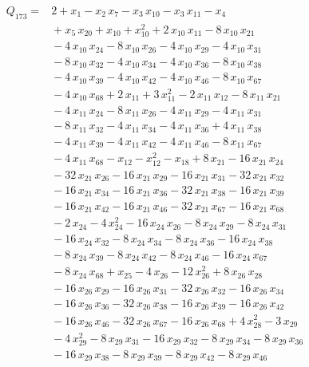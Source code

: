 \documentclass[11pt]{article}
\theoremstyle{definition}\newtheorem{definition}[theorem]{Definition}
\begin{document}
\begin{align*}
Q_{173}={}&2+x_{1}-x_{2}\,x_{7}-x_{3}\,x_{10}-x_{3}\,x_{11}-x_{4}
\\ &{}+x_{5}\,x_{20}+x_{10}+x_{10}^{2}+2\,x_{10}\,x_{11}-8\,x_{10}\,x_{21}
\\ &{}-4\,x_{10}\,x_{24}-8\,x_{10}\,x_{26}-4\,x_{10}\,x_{29}-4\,x_{10}\,x_{31}
\\ &{}-8\,x_{10}\,x_{32}-4\,x_{10}\,x_{34}-4\,x_{10}\,x_{36}-8\,x_{10}\,x_{38}
\\ &{}-4\,x_{10}\,x_{39}-4\,x_{10}\,x_{42}-4\,x_{10}\,x_{46}-8\,x_{10}\,x_{67}
\\ &{}-4\,x_{10}\,x_{68}+2\,x_{11}+3\,x_{11}^{2}-2\,x_{11}\,x_{12}-8\,x_{11}\,x_{21}
\\ &{}-4\,x_{11}\,x_{24}-8\,x_{11}\,x_{26}-4\,x_{11}\,x_{29}-4\,x_{11}\,x_{31}
\\ &{}-8\,x_{11}\,x_{32}-4\,x_{11}\,x_{34}-4\,x_{11}\,x_{36}+4\,x_{11}\,x_{38}
\\ &{}-4\,x_{11}\,x_{39}-4\,x_{11}\,x_{42}-4\,x_{11}\,x_{46}-8\,x_{11}\,x_{67}
\\ &{}-4\,x_{11}\,x_{68}-x_{12}-x_{12}^{2}-x_{18}+8\,x_{21}-16\,x_{21}\,x_{24}
\\ &{}-32\,x_{21}\,x_{26}-16\,x_{21}\,x_{29}-16\,x_{21}\,x_{31}-32\,x_{21}\,x_{32}
\\ &{}-16\,x_{21}\,x_{34}-16\,x_{21}\,x_{36}-32\,x_{21}\,x_{38}-16\,x_{21}\,x_{39}
\\ &{}-16\,x_{21}\,x_{42}-16\,x_{21}\,x_{46}-32\,x_{21}\,x_{67}-16\,x_{21}\,x_{68}
\\ &{}-2\,x_{24}-4\,x_{24}^{2}-16\,x_{24}\,x_{26}-8\,x_{24}\,x_{29}-8\,x_{24}\,x_{31}
\\ &{}-16\,x_{24}\,x_{32}-8\,x_{24}\,x_{34}-8\,x_{24}\,x_{36}-16\,x_{24}\,x_{38}
\\ &{}-8\,x_{24}\,x_{39}-8\,x_{24}\,x_{42}-8\,x_{24}\,x_{46}-16\,x_{24}\,x_{67}
\\ &{}-8\,x_{24}\,x_{68}+x_{25}-4\,x_{26}-12\,x_{26}^{2}+8\,x_{26}\,x_{28}
\\ &{}-16\,x_{26}\,x_{29}-16\,x_{26}\,x_{31}-32\,x_{26}\,x_{32}-16\,x_{26}\,x_{34}
\\ &{}-16\,x_{26}\,x_{36}-32\,x_{26}\,x_{38}-16\,x_{26}\,x_{39}-16\,x_{26}\,x_{42}
\\ &{}-16\,x_{26}\,x_{46}-32\,x_{26}\,x_{67}-16\,x_{26}\,x_{68}+4\,x_{28}^{2}-3\,x_{29}
\\ &{}-4\,x_{29}^{2}-8\,x_{29}\,x_{31}-16\,x_{29}\,x_{32}-8\,x_{29}\,x_{34}-8\,x_{29}\,x_{36}
\\ &{}-16\,x_{29}\,x_{38}-8\,x_{29}\,x_{39}-8\,x_{29}\,x_{42}-8\,x_{29}\,x_{46}

\end{align*}
\end{document}
